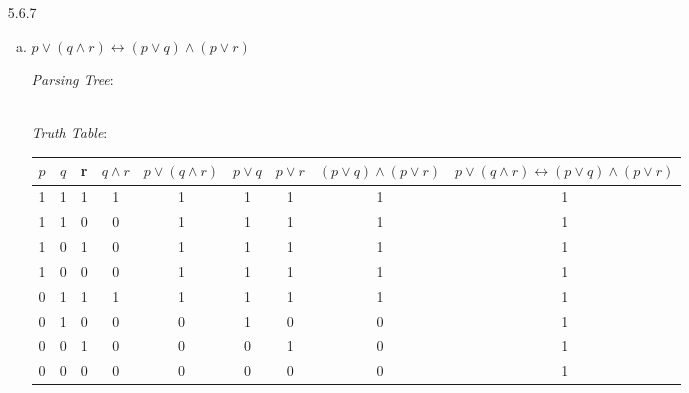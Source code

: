 \begin{enumerate}
		\item[5.6.7]
		
		\begin{enumerate}[(a)]
		
			\item $p \lor (q \land r) \leftrightarrow (p \lor q) \land(p \lor r)$
			
			\begin{center}
			\emph{Parsing Tree}:\\[1ex]
			
				\\[2ex]
				
			\emph{Truth Table}:\\[2ex]
			
			{\tiny\begin{tabular}{c c c | c | c  c  c  c  c}
$p$ & $q$  & r & $q\land r$ & $p \lor (q \land r)$ & $p\lor q$ & $p\lor r$ & $(p \lor q) \land(p \lor r)$ & $p \lor (q \land r) \leftrightarrow (p \lor q) \land(p \lor r)$ \\\hline

1 & 1 & 1 & 1 & 1&1&1&1& 1\\

1 & 1 & 0 & 0& 1&1&1&1&  1\\

1 & 0 & 1 & 0 & 1&1&1&1& 1\\

1 & 0 & 0  & 0 &1 &1&1& 1& 1\\

0 & 1 &  1 & 1 &1 &1&1& 1& 1\\

0 & 1 & 0 & 0&0 & 1&0&0& 1 \\

0 & 0 & 1 & 0 & 0& 0&1&0& 1  \\

0 & 0 & 0 & 0 & 0& 0&0&0& 1

\end{tabular}}

\vspace{2ex}

\end{center}


\end{enumerate}
\end{enumerate}
